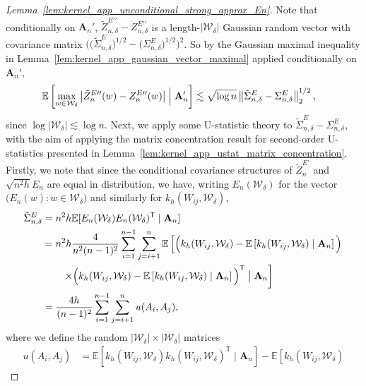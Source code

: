 \documentclass[11pt,lof]{puthesis}
\newcommand{\E}{\ensuremath{\mathbb{E}}}
\newcommand{\bA}{\ensuremath{\mathbf{A}}}
\newcommand{\cW}{\ensuremath{\mathcal{W}}}
\newcommand{\T}{\ensuremath{\mathsf{T}}}
\newcommand{\dprime}{\ensuremath{\prime\prime}}
\theoremstyle{break}
\theoremstyle{proof}
\newtheorem{proof}{Proof}
\begin{document}
\begin{proof}[Lemma~\ref{lem:kernel_app_unconditional_strong_approx_En}]
  Note that conditionally on $\bA_n'$,
  $\tilde Z_{n,\delta}^{E\dprime} - Z_{n,\delta}^{E\dprime}$
  is a length-$|\cW_\delta|$
  Gaussian random vector with covariance matrix
  $\big(
    \big(\tilde \Sigma^E_{n,\delta}\big)^{1/2}
    - \big(\Sigma^E_{n,\delta}\big)^{1/2}
  \big)^2$.
  So by the Gaussian maximal inequality in
  Lemma~\ref{lem:kernel_app_gaussian_vector_maximal}
  applied conditionally on $\bA_n'$,
  \begin{align*}
    \E\left[
      \max_{w \in \cW_\delta}
      \big|\tilde Z_n^{E\dprime}(w) - Z_n^{E\dprime}(w)\big|
      \Bigm| \bA_n'
    \right]
    &\lesssim
    \sqrt{\log n}
    \left\|
    \tilde\Sigma^E_{n,\delta}
    - \Sigma^E_{n,\delta}
    \right\|_2^{1/2},
  \end{align*}
  since $\log |\cW_\delta| \lesssim \log n$.
  Next, we apply some U-statistic theory to
  $\tilde\Sigma^E_{n,\delta} - \Sigma^E_{n,\delta}$,
  with the aim of applying the
  matrix concentration result
  for second-order U-statistics
  presented in Lemma~\ref{lem:kernel_app_ustat_matrix_concentration}.
  Firstly, we note that
  since the conditional covariance structures of $\tilde Z_n^{E\prime}$ and
  $\sqrt{n^2h} E_n$ are equal in distribution, we have, writing
  $E_n(\cW_\delta)$ for the vector $\big(E_n(w) : w \in \cW_\delta\big)$ and
  similarly for $k_h(W_{i j}, \cW_\delta)$,
  \begin{align*}
    \tilde\Sigma^E_{n,\delta}
    &=
    n^2h \E[E_n(\cW_\delta) E_n(\cW_\delta)^\T \mid \bA_n] \\
    &=
    n^2h
    \frac{4}{n^2(n-1)^2}
    \sum_{i=1}^{n-1}
    \sum_{j=i+1}^{n}
    \E\left[
      \Big(
        k_h(W_{i j}, \cW_\delta)
        - \E\left[
          k_h(W_{i j}, \cW_\delta)
          \mid \bA_n
        \right]
      \Big)
      \right. \\
      &\qquad\left.
      \times\Big(
        k_h(W_{i j}, \cW_\delta)
        - \E\left[
          k_h(W_{i j}, \cW_\delta)
          \mid \bA_n
        \right]
      \Big)^\T
      \bigm\vert \bA_n
    \right] \\
    &=
    \frac{4h}{(n-1)^2}
    \sum_{i=1}^{n-1}
    \sum_{j=i+1}^{n}
    u(A_i, A_j),
  \end{align*}
  where we
  define the random
  $|\cW_\delta| \times |\cW_\delta|$
  matrices
  \begin{align*}
    u(A_i, A_j)
    &=
    \E\!\left[
      k_h(W_{i j}, \cW_\delta)
      k_h(W_{i j}, \cW_\delta)^\T
      \mid \bA_n
    \right]
    -
    \E\!\left[
      k_h(W_{i j}, \cW_\delta)

\end{align*}
\end{proof}
\end{document}
